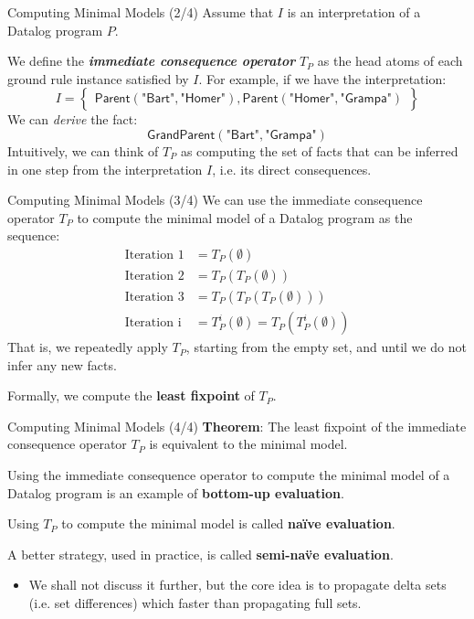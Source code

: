 \begin{frame}{Computing Minimal Models (2/4)}
Assume that $I$ is an interpretation of a Datalog program $P$.

We define the \textbf{\emph{immediate consequence operator}} $T_P$ as the head
atoms of each ground rule instance satisfied by $I$. For example, if we have the
interpretation:
$$
I = \left\{
\begin{array}{l}
\textsf{Parent}(\textsf{"Bart"}, \textsf{"Homer"}), \textsf{Parent}(\textsf{"Homer"}, \textsf{"Grampa"})
\end{array}\right\}
$$
We can \emph{derive} the fact:
$$
\textsf{GrandParent}(\textsf{"Bart"}, \textsf{"Grampa"})
$$
Intuitively, we can think of $T_P$ as computing the set of facts that can be
inferred in one step from the interpretation $I$, i.e. its direct consequences.
\end{frame}

\begin{frame}{Computing Minimal Models (3/4)}
We can use the immediate consequence operator $T_P$ to compute the minimal model
of a Datalog program as the sequence:
%
\begin{align*}
\text{Iteration 1} &= T_P(\emptyset) \\
\text{Iteration 2} &= T_P(T_P(\emptyset)) \\
\text{Iteration 3} &= T_P(T_P(T_P(\emptyset))) \\ 
\text{Iteration i} &= T_P^i(\emptyset) = T_P(T_P^i(\emptyset))
\end{align*}
%
That is, we repeatedly apply $T_P$, starting from the empty set, and until we do
not infer any new facts. 

Formally, we compute the \textbf{least fixpoint} of $T_P$.
\end{frame}

\begin{frame}{Computing Minimal Models (4/4)}
\textbf{Theorem}: The least fixpoint of the immediate consequence operator $T_P$
is equivalent to the minimal model.

Using the immediate consequence operator to compute the minimal model of a
Datalog program is an example of \textbf{bottom-up evaluation}.

Using $T_P$ to compute the minimal model is called \textbf{na\"ive
evaluation}.

A better strategy, used in practice, is called \textbf{semi-na\"ve evaluation}.
\begin{itemize}
    \item We shall not discuss it further, but the core idea is to propagate
    delta sets (i.e. set differences) which faster than propagating full sets.
\end{itemize}
\end{frame}

